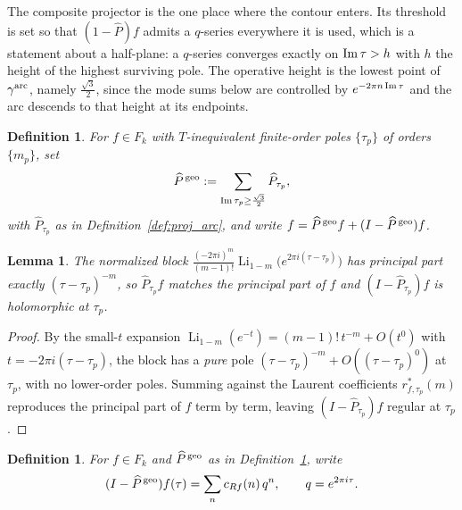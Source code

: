 \documentclass[11pt]{article}
\newtheorem{lemma}[theorem]{Lemma}
\newtheorem{definition}[theorem]{Definition}
\DeclareMathOperator{\Li}{Li}
\begin{document}
The composite projector is the one place where the contour enters. Its threshold is set so that
$(1-\widehat P)f$ admits a $q$-series everywhere it is used, which is a statement about a
half-plane: a $q$-series converges exactly on ${\rm Im}\,\tau>h$ with $h$ the height of the highest
surviving pole. The operative height is the lowest point of $\gamma^{\rm arc}$, namely
$\tfrac{\sqrt3}{2}$, since the mode sums below are controlled by $e^{-2\pi n\,{\rm Im}\,\tau}$ and
the arc descends to that height at its endpoints.

\begin{definition}\label{def:geoproj}
For $f\in F_k$ with $T$-inequivalent finite-order poles $\{\tau_p\}$ of orders $\{m_p\}$, set
\begin{equation}\label{eq:polesplit_arc}
\widehat P^{\,\rm geo}:=\sum_{{\rm Im}\,\tau_p\ge\frac{\sqrt3}{2}}\widehat P_{\tau_p},
\end{equation}
with $\widehat P_{\tau_p}$ as in Definition~\ref{def:proj_arc}, and write
$f=\widehat P^{\,\rm geo}f+(I-\widehat P^{\,\rm geo})f$.
\end{definition}

\begin{lemma}\label{lem:proj_arc}
The normalized block $\frac{(-2\pi i)^m}{(m-1)!}\Li_{1-m}\big(e^{2\pi i(\tau-\tau_p)}\big)$ has
principal part exactly $(\tau-\tau_p)^{-m}$, so $\widehat P_{\tau_p}f$ matches the principal part
of $f$ and $(I-\widehat P_{\tau_p})f$ is holomorphic at $\tau_p$.
\end{lemma}
\begin{proof}
By the small-$t$ expansion $\Li_{1-m}(e^{-t})=(m-1)!\,t^{-m}+O(t^0)$ with
$t=-2\pi i(\tau-\tau_p)$, the block has a \emph{pure} pole
$(\tau-\tau_p)^{-m}+O((\tau-\tau_p)^0)$ at $\tau_p$, with no lower-order poles. Summing against the
Laurent coefficients $r^*_{f,\tau_p}(m)$ reproduces the principal part of $f$ term by term, leaving
$(I-\widehat P_{\tau_p})f$ regular at $\tau_p$.
\end{proof}

\begin{definition}\label{def:cRf_arc}
For $f\in F_k$ and $\widehat P^{\,\rm geo}$ as in Definition~\ref{def:geoproj}, write
\begin{equation}
(I-\widehat P^{\,\rm geo})f(\tau)=\sum_n c_{Rf}(n)\,q^n,\qquad q=e^{2\pi i\tau}.
\end{equation}
\end{definition}
\end{document}
